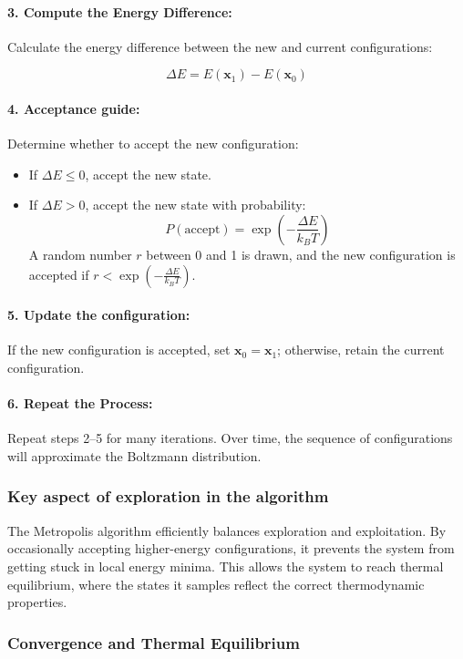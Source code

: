 \documentclass[11pt]{article}
\begin{document}
\paragraph*{3. Compute the Energy Difference:}  
Calculate the energy difference between the new and current configurations:

\[
\Delta E = E(\mathbf{x}_1) - E(\mathbf{x}_0)
\]

\paragraph*{4. Acceptance guide:}  
Determine whether to accept the new configuration:
\begin{itemize}
    \item If \(\Delta E \leq 0\), accept the new state.
    \item If \(\Delta E > 0\), accept the new state with probability:
    \[
    P(\text{accept}) = \exp\left(-\frac{\Delta E}{k_B T}\right)
    \]
    A random number \(r\) between 0 and 1 is drawn, and the new configuration is accepted if \(r < \exp\left(-\frac{\Delta E}{k_B T}\right)\).
\end{itemize}

\paragraph*{5. Update the configuration:}  
If the new configuration is accepted, set \(\mathbf{x}_0 = \mathbf{x}_1\); otherwise, retain the current configuration.

\paragraph*{6. Repeat the Process:}  
Repeat steps 2–5 for many iterations. Over time, the sequence of configurations will approximate the Boltzmann distribution.

\subsubsection*{Key aspect of exploration in the algorithm}

The Metropolis algorithm efficiently balances exploration and exploitation. By occasionally accepting higher-energy configurations, it prevents the system from getting stuck in local energy minima. This allows the system to reach thermal equilibrium, where the states it samples reflect the correct thermodynamic properties.

\subsubsection*{Convergence and Thermal Equilibrium}
\end{document}
